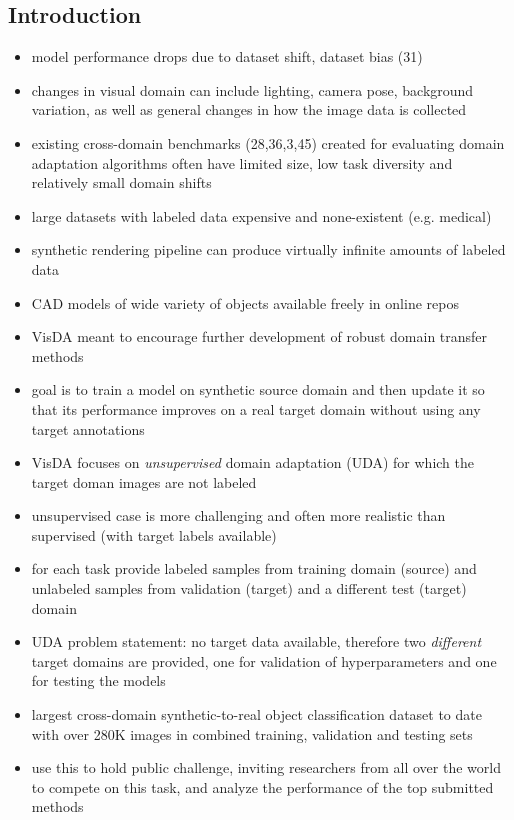 \documentclass[]{article}
\begin{document}
\subsection{Introduction}
\begin{itemize}
	\item model performance drops due to dataset shift, dataset bias (31)
	\item changes in visual domain can include lighting, camera pose, background variation, as well as general changes in how the image data is collected
	\item existing cross-domain benchmarks (28,36,3,45) created for evaluating domain adaptation algorithms often have limited size, low task diversity and relatively small domain shifts
	\item large datasets with labeled data expensive and none-existent (e.g. medical)
	\item synthetic rendering pipeline can produce virtually infinite amounts of labeled data
	\item CAD models of wide variety of objects available freely in online repos
	\item VisDA meant to encourage further development of robust domain transfer methods
	\item goal is to train a model on synthetic source domain and then update it so that its performance improves on a real target domain without using any target annotations
	\item VisDA focuses on \textit{unsupervised} domain adaptation (UDA) for which the target doman images are not labeled
	\item unsupervised case is more challenging and often more realistic than supervised (with target labels available)
	\item for each task provide labeled samples from training domain (source) and unlabeled samples from validation (target) and a different test (target) domain
	\item UDA problem statement: no target data available, therefore two \textit{different} target domains are provided, one for validation of hyperparameters and one for testing the models
	\item largest cross-domain synthetic-to-real object classification dataset to date with over 280K images in combined training, validation and testing sets
	\item use this to hold public challenge, inviting researchers from all over the world to compete on this task, and analyze the performance of the top submitted methods
\end{itemize}
\end{document}
